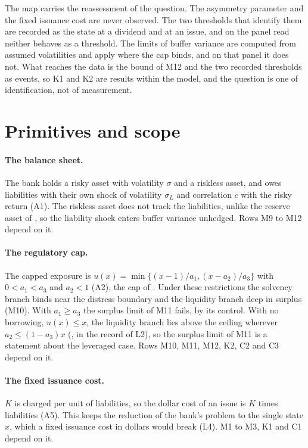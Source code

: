 The map carries the reassessment of the question. The asymmetry parameter and
the fixed issuance cost are never observed. The two thresholds that identify
them are recorded as the state at a dividend and at an issue, and on the panel
read neither behaves as a threshold. The limits of buffer variance are computed
from assumed volatilities and apply where the cap binds, and on that panel it
does not. What reaches the data is the bound of M12 and the two recorded
thresholds as events, so K1 and K2 are results within the model, and the
question is one of identification, not of measurement.



\section{Primitives and scope}
\label{app:scope}

\paragraph{The balance sheet.} The bank holds a risky asset with volatility
$\sigma$ and a riskless asset, and owes liabilities with their own shock of
volatility $\sigma_L$ and correlation $c$ with the risky return (A1). The
riskless asset does not track the liabilities, unlike the reserve asset of
\citet{blackperold1992}, so the liability shock enters buffer variance
unhedged. Rows M9 to M12 depend on it.

\paragraph{The regulatory cap.} The capped exposure is
$u(x)=\min\{(x-1)/a_1,(x-a_2)/a_3\}$ with $0<a_1<a_3$ and $a_2<1$ (A2), the cap
of \citet{bayraktar2026}. Under these restrictions the solvency branch binds
near the distress boundary and the liquidity branch deep in surplus (M10).
With $a_1\ge a_3$ the surplus limit of M11 fails, by its control. With no
borrowing, $u(x)\le x$, the liquidity branch lies above the ceiling wherever
$a_2\le(1-a_3)x$ (, in the record of L2),
so the surplus limit of M11 is a statement about the leveraged case. Rows M10,
M11, M12, K2, C2 and C3 depend on it.

\paragraph{The fixed issuance cost.} $K$ is charged per unit of liabilities,
so the dollar cost of an issue is $K$ times liabilities (A5). This keeps the
reduction of the bank's problem to the single state $x$, which a fixed issuance cost in
dollars would break (L4). M1 to M3, K1 and C1 depend on it.

